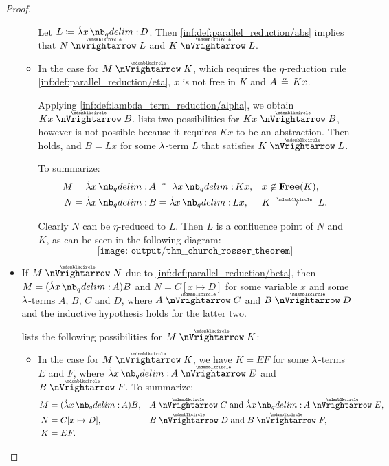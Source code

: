 \begin{proof}
\begin{itemize}
\begin{itemize}
      Let \( L \coloneqq \qabs x D \). Then \ref{inf:def:parallel_reduction/abs} implies that \( N \ppred L \) and \( K \ppred L \).

      \item In the case  for \( M \ppred K \), which requires the \( \eta \)-reduction rule \ref{inf:def:parallel_reduction/eta}, \( x \) is not free in \( K \) and \( A \aequiv Kx \).

      Applying \ref{inf:def:lambda_term_reduction/alpha}, we obtain \( Kx \ppred B \).  lists two possibilities for \( Kx \ppred B \), however  is not possible because it requires \( Kx \) to be an abstraction. Then  holds, and \( B = Lx \) for some \( {\mathrm \lambda} \)-term \( L \) that satisfies \( K \ppred L \).

      To summarize:
      \begin{align*}
        M &= \qabs x A \aequiv \qabs x Kx, &&x \not\in \op*{Free}(K), \\
        N &= \qabs x B = \qabs x Lx,       &&K \pred L.
      \end{align*}

      Clearly \( N \) can be \( \eta \)-reduced to \( L \). Then \( L \) is a confluence point of \( N \) and \( K \), as can be seen in the following diagram:
      \begin{equation*}
        \texttt{[image: output/thm\_\_church\_rosser\_theorem]}
      \end{equation*}
    \end{itemize}

    \item If \( M \ppred N \) due to \ref{inf:def:parallel_reduction/beta}, then \( M = (\qabs x A)B \) and \( N = C[x \mapsto D] \) for some variable \( x \) and some \( {\mathrm \lambda} \)-terms \( A \), \( B \), \( C \) and \( D \), where \( A \ppred C \) and \( B \ppred D \) and the inductive hypothesis holds for the latter two.

     lists the following possibilities for \( M \ppred K \):
    \begin{itemize}
      \item In the case  for \( M \ppred K \), we have \( K = EF \) for some \( {\mathrm \lambda} \)-terms \( E \) and \( F \), where \( \qabs x A \ppred E \) and \( B \ppred F \). To summarize:
      \begin{align*}
        M &= (\qabs x A) B,           &&A \ppred C \T{and} \qabs x A \ppred E, \\
        N &= C[x \mapsto D],          &&B \ppred D \T{and} B \ppred F, \\
        K &= E F.                     &&
      \end{align*}


\end{itemize}
\end{itemize}
\end{proof}
